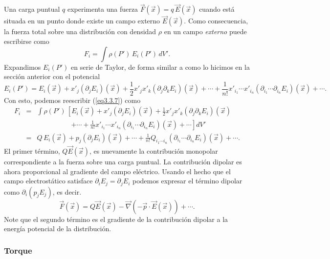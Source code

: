 Una carga puntual $q$ experimenta una fuerza
$\vec{F}(\vec{x})=q\,\vec{E}(\vec{x})$ cuando está situada en
un punto donde existe un campo externo $\vec{E}(\vec{x})$. Como consecuencia,
la fuerza total sobre una distribución con densidad $\rho$ en un campo
\textit{externo} puede escribirse como
\begin{equation} \label{eq3.3.7}
F_i=\int \rho(P')\,E_i(P')\,dV'.
\end{equation}
Expandimos $E_i(P')$ en serie de Taylor, de forma similar a como lo
hicimos en la sección anterior con el potencial
\begin{equation} \label{eq3.3.7.1}
E_i(P')=E_i(\vec{x})+x'_j(\partial_jE_i)(\vec{x})+\frac{1}{
2}x'_jx'_k(\partial_j\partial_kE_i)(\vec{x})
+\cdots+\frac{1}{n!}x'_{i_1}\cdots
x'_{i_n}(\partial_{i_1}\cdots\partial_{i_n}E_i)(\vec {x})+\cdots .
\end{equation}
Con esto, podemos reescribir (\ref{eq3.3.7}) como
\begin{eqnarray}
F_i&=& \int
\rho(P')\,\left[E_i(\vec{x})+x'_j(\partial_jE_i)(\vec{x})+\frac{1}{
2}x'_jx'_k(\partial_j\partial_kE_i)(\vec{x}) \right.\nonumber\\
&& \quad\qquad\qquad \left. +\cdots+\frac{1}{n!}x'_{i_1}\cdots
x'_{i_n}(\partial_{i_1}\cdots\partial_{i_n}E_i)(\vec {x})+\cdots\right] dV' \\
&=&
Q\,E_i(\vec{x})+p_j(\partial_jE_i)(\vec{x})+\cdots+\frac{1}{n!}Q_{i_1\cdots i_n}
(\partial_{i_1}\cdots\partial_{i_n}E_i)(\vec {x})+\cdots .\label{eq3.3.8}
\end{eqnarray}
El primer término, $Q\vec{E}(\vec{x})$, es nuevamente la contribución monopolar correspondiente a la fuerza sobre una carga puntual. La contribución
dipolar es ahora proporcional al gradiente del campo eléctrico. Usando el hecho que el campo electrostático satisface
$\partial_iE_j=\partial_jE_i$ podemos expresar el término dipolar como $\partial_i(p_jE_j)$,
es decir.
\begin{equation} \label{eq3.3.12}
\boxed{\vec{F}(\vec{x}) =
Q\vec{E}(\vec{x})-\vec{\nabla}\left(-\vec{p}\cdot\vec{E}(\vec{x})\right)+\cdots.
}
\end{equation}
Note que el segundo término es el gradiente de la contribución dipolar a la
energía potencial de la distribución.

\subsubsection{Torque}  \label{ed3_3_3}


